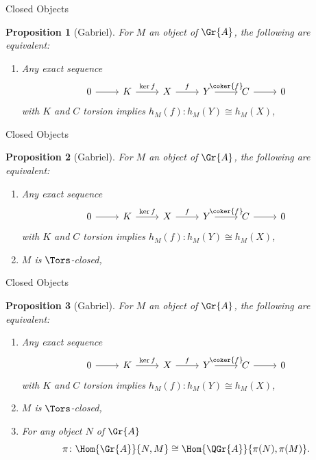 \documentclass{beamer}
\newtheorem{prop}{Proposition}
\theoremstyle{definition}
\begin{document}
\begin{frame}[fragile]{Closed Objects}
  \begin{prop}[Gabriel]
    For $M$ an object of $\Gr{A}$, the following are equivalent:
    \begin{enumerate}
    \item
      Any exact sequence
      $$\begin{tikzcd}
          0 \arrow{r} & K \arrow{r}{\ker{f}} & X \arrow{r}{f} & Y \arrow{r}{\coker{f}} & C \arrow{r} & 0
        \end{tikzcd}$$
      with $K$ and $C$ torsion implies $h_M(f) \colon h_M(Y) \cong h_M(X)$,
    \end{enumerate}
  \end{prop}
\end{frame}

\begin{frame}[fragile]{Closed Objects}
  \setcounter{prop}{0}
  \begin{prop}[Gabriel]
    For $M$ an object of $\Gr{A}$, the following are equivalent:
    \begin{enumerate}
    \item
      Any exact sequence
      $$\begin{tikzcd}
          0 \arrow{r} & K \arrow{r}{\ker{f}} & X \arrow{r}{f} & Y \arrow{r}{\coker{f}} & C \arrow{r} & 0
        \end{tikzcd}$$
      with $K$ and $C$ torsion implies $h_M(f) \colon h_M(Y) \cong h_M(X)$,
    \item
      $M$ is $\Tors$-closed,
    \end{enumerate}
  \end{prop}
\end{frame}

\begin{frame}[fragile]{Closed Objects}
  \setcounter{prop}{0}
  \begin{prop}[Gabriel]
    For $M$ an object of $\Gr{A}$, the following are equivalent:
    \begin{enumerate}
    \item
      Any exact sequence
      $$\begin{tikzcd}
          0 \arrow{r} & K \arrow{r}{\ker{f}} & X \arrow{r}{f} & Y \arrow{r}{\coker{f}} & C \arrow{r} & 0
        \end{tikzcd}$$
      with $K$ and $C$ torsion implies $h_M(f) \colon h_M(Y) \cong h_M(X)$,
    \item
      $M$ is $\Tors$-closed,
    \item
      For any object $N$ of $\Gr{A}$
      $$\pi \colon \Hom{\Gr{A}}{N, M} \cong \Hom{\QGr{A}}{\pi(N), \pi(M)}.$$ 
    \end{enumerate}
  \end{prop}
\end{frame}
\end{document}
